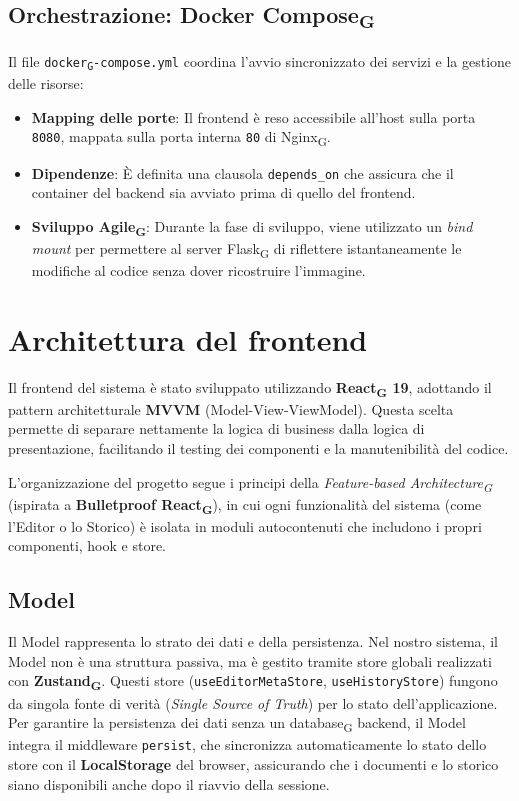 \documentclass[11pt,a4paper]{article}
\newcommand{\gls}[1]{#1\textsubscript{G}}
\begin{document}
\subsection{Orchestrazione: \gls{Docker Compose}}
Il file \texttt{\gls{docker}-compose.yml} coordina l'avvio sincronizzato dei servizi e la gestione delle risorse:
\begin{itemize}
    \item \textbf{Mapping delle porte}: Il frontend è reso accessibile all'host sulla porta \texttt{8080}, mappata sulla porta interna \texttt{80} di \gls{Nginx}.
    \item \textbf{Dipendenze}: È definita una clausola \texttt{depends\_on} che assicura che il container del backend sia avviato prima di quello del frontend.
    \item \textbf{Sviluppo \gls{Agile}}: Durante la fase di sviluppo, viene utilizzato un \textit{bind mount} per permettere al server \gls{Flask} di riflettere istantaneamente le modifiche al codice senza dover ricostruire l'immagine.
\end{itemize}

\newpage

\section{Architettura del frontend}
Il frontend del sistema è stato sviluppato utilizzando \textbf{\gls{React} 19}, adottando il pattern architetturale \textbf{MVVM} (Model-View-ViewModel). Questa scelta permette di separare nettamente la logica di business dalla logica di presentazione, facilitando il testing dei componenti e la manutenibilità del codice.

L'organizzazione del progetto segue i principi della \textit{\gls{Feature-based Architecture}} (ispirata a \textbf{Bulletproof \gls{React}}), in cui ogni funzionalità del sistema (come l'Editor o lo Storico) è isolata in moduli autocontenuti che includono i propri componenti, hook e store.

\subsection{Model}
Il Model rappresenta lo strato dei dati e della persistenza. Nel nostro sistema, il Model non è una struttura passiva, ma è gestito tramite store globali realizzati con \textbf{\gls{Zustand}}. Questi store (\texttt{useEditorMetaStore}, \texttt{useHistoryStore}) fungono da singola fonte di verità (\textit{Single Source of Truth}) per lo stato dell'applicazione.
Per garantire la persistenza dei dati senza un \gls{database} backend, il Model integra il middleware \texttt{persist}, che sincronizza automaticamente lo stato dello store con il \textbf{LocalStorage} del browser, assicurando che i documenti e lo storico siano disponibili anche dopo il riavvio della sessione.
\end{document}
